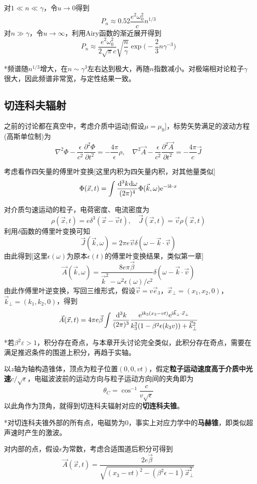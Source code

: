 \documentclass[a4paper,UTF8,fontset=windows]{ctexart}
\newcommand*{\dr}{\hspace{0.07em}\mathrm{d}}
\newcommand*{\er}{\mathrm{e}}
\newcommand*{\ir}{\mathrm{i}}
\newcommand*{\va}{\vec{A}}
\newcommand*{\vj}{\vec{J}}
\newcommand*{\ves}{\vec{e}}
\newcommand*{\vks}{\vec{k}}
\newcommand*{\vvs}{\vec{v}}
\newcommand*{\vx}{\vec{x}}
\newcommand*{\vbeta}{\vec{\beta}}
\newcommand*{\ppt}[2][t^2]{\frac{\partial^2 #2}{\partial #1}}
\begin{document}
对$1\ll n\ll\gamma$，令$u\to0$得到
$$P_n\approx0.52\frac{e^2\omega_0^2}{c}n^{1/3}$$
对$n\gg\gamma$，令$u\to\infty$，利用Airy函数的渐近展开得到
$$P_n\approx\frac{e^2\omega_0^2}{2\sqrt{\pi}c}\sqrt{\frac{n}{\gamma}}\exp\bigg(-\frac{2}{3}n\gamma^{-3}\bigg)$$

*频谱随$n^{1/3}$增大，在$n\sim\gamma^3$左右达到极大，再随$n$指数减小。对极端相对论粒子$\gamma$很大，因此频谱非常宽，与定性结果一致。

\subsection{切连科夫辐射}

之前的讨论都在真空中，考虑介质中运动[假设$\mu=\mu_0$]，标势矢势满足的波动方程(高斯单位制)为
$$\nabla^2\Phi-\frac{\epsilon}{c^2}\ppt{\Phi}=-\frac{4\pi}{\epsilon}\rho,\quad\nabla^2\va-\frac{\epsilon}{c^2}\ppt{\va}=-\frac{4\pi}{c}\vj$$

考虑看作四矢量的傅里叶变换[这里内积为四矢量内积，对其他量类似]
$$\Phi(\vx,t)=\int\frac{\dr^3k\dr\omega}{(2\pi)^4}\Phi(\vks,\omega)\er^{-\ir k\cdot x}$$

对介质匀速运动的粒子，电荷密度、电流密度为
$$\rho(\vx,t)=e\delta^3(\vx-\vvs t),\quad\vj(\vx,t)=\vvs\rho(\vx,t)$$
利用$\delta$函数的傅里叶变换可知
$$\vj(\vks,\omega)=2\pi e\vvs\delta(\omega-\vks\cdot\vvs)$$
由此得到[这里$\epsilon(\omega)$为原本$\epsilon(t)$的傅里叶变换结果，类似第一章]
$$\va(\vks,\omega)=\frac{8e\pi\vbeta}{\vks^2-\omega^2\epsilon(\omega)/c^2}\delta(\omega-\vks\cdot\vvs)$$
由此作傅里叶逆变换，写回三维形式，假设$\vvs=v\ves_3$，$\vx_\bot=(x_1,x_2,0)$，$\vks_\bot=(k_1,k_2,0)$，得到
$$\va(\vx,t)=4\pi e\vbeta\int\frac{\dr^3k}{(2\pi)^3}\frac{\er^{\ir k_3(x_3-vt)}\er^{\ir\vks_\bot\cdot\vx_\bot}}{k_3^2(1-\beta^2\epsilon(k_3v))+\vks_\bot^2}$$

*若$\beta^2\varepsilon>1$，积分存在奇点，与本章开头讨论完全类似，此积分存在奇点，需要在满足推迟条件的围道上积分，再趋于实轴。

以$z$轴为轴构造锥体，顶点为粒子位置$(0,0,vt)$，假定\textbf{粒子运动速度高于介质中光速}$c/\sqrt\epsilon$，电磁波波前的运动方向与粒子运动方向间的夹角即为
$$\theta_C=\cos^{-1}\frac{c}{v\sqrt\epsilon}$$
以此角作为顶角，就得到切连科夫辐射对应的\textbf{切连科夫锥}。

*对切连科夫锥外部的所有点，电磁势为0，事实上对应力学中的\textbf{马赫锥}，即类似超声速时产生的激波。

对内部的点，假设$\epsilon$为常数，考虑合适围道后积分可得到
$$\va(\vx,t)=\frac{2e\vbeta}{\sqrt{(x_3-vt)^2-(\beta^2\epsilon-1)\vx_\bot^2}}$$
\end{document}
